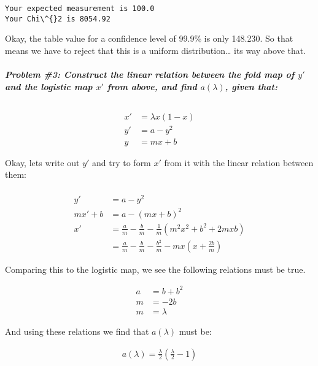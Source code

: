 \documentclass{article}
\begin{document}
    \begin{Verbatim}[commandchars=\\\{\}]
Your expected measurement is 100.0
Your Chi\^{}2 is 8054.92
    \end{Verbatim}

    Okay, the table value for a confidence level of 99.9\% is only 148.230.
So that means we have to reject that this is a uniform
distribution\ldots{} its way above that.


    \subparagraph{Problem \#3: Construct the linear relation between the fold map of
\(y'\) and the logistic map \(x'\) from above, and find \(a(\lambda)\),
given that:}


    \begin{align} \\ x'&=\lambda x(1-x) \\ y'&=a-y^2 \\ y&=mx+b \end{align}

    Okay, lets write out \(y'\) and try to form \(x'\) from it with the
linear relation between them:

    \begin{align} \\ y'&=a-y^2 \\ mx'+b &= a - (mx +b)^2 \\ x' &= \frac{a}{m} - \frac{b}{m} - \frac{1}{m}(m^2x^2 + b^2 + 2mxb) \\
&= \frac{a}{m} - \frac{b}{m} - \frac{b^2}{m} - mx\left(x+\frac{2b}{m} \right) \end{align}

    Comparing this to the logistic map, we see the following relations must
be true.

    \begin{align} a &= b + b^2 \\ m &= -2b \\ m &= \lambda \end{align}

    And using these relations we find that \(a(\lambda)\) must be:

\begin{align} a(\lambda) = \frac{\lambda}{2}\left(\frac{\lambda}{2} - 1 \right) \end{align}


    
    
    
    
\end{document}
